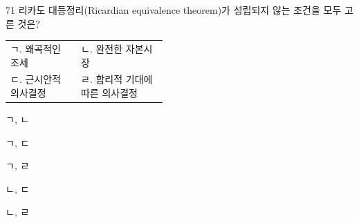 \begin{question}{71}
리카도 대등정리(Ricardian equivalence theorem)가 성립되지 않는 조건을 모두 고른 것은?
\begin{framedtext}
\begin{tabular}{@{}p{0.45\linewidth}l@{}}
ㄱ. 왜곡적인 조세 & ㄴ. 완전한 자본시장 \\
ㄷ. 근시안적 의사결정 & ㄹ. 합리적 기대에 따른 의사결정
\end{tabular}
\end{framedtext}
\begin{choices}
  \item ㄱ, ㄴ
  \item ㄱ, ㄷ
  \item ㄱ, ㄹ
  \item ㄴ, ㄷ
  \item ㄴ, ㄹ
\end{choices}
\end{question}

